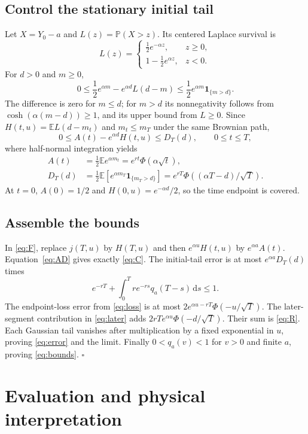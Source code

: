 \documentclass[11pt,a4paper]{article}
\newcommand{\Prob}{\mathbb P}
\newcommand{\E}{\mathbb E}
\newcommand{\dd}{\,\mathrm d}
\begin{document}
\subsection{Control the stationary initial tail}
Let $X=Y_0-a$ and $L(z)=\Prob(X>z)$. Its centered Laplace survival is
\[
L(z)=
\begin{cases}
\tfrac12e^{-\alpha z},&z\geq0,\\
1-\tfrac12e^{\alpha z},&z<0.
\end{cases}
\]
For $d>0$ and $m\geq0$,
\begin{equation}\label{eq:laplace}
0\leq \frac12e^{\alpha m}-e^{\alpha d}L(d-m)
\leq\frac12e^{\alpha m}\mathbf1_{\{m>d\}}.
\end{equation}
The difference is zero for $m\leq d$; for $m>d$ its nonnegativity follows
from $\cosh(\alpha(m-d))\geq1$, and its upper bound from $L\geq0$.
Since $H(t,u)=\E L(d-m_t)$ and $m_t\leq m_T$ under the same Brownian path,
\begin{equation}\label{eq:Hbound}
0\leq A(t)-e^{\alpha d}H(t,u)\leq D_T(d),\qquad 0\leq t\leq T,
\end{equation}
where half-normal integration yields
\begin{align}\label{eq:AD}
A(t)&=\tfrac12\E e^{\alpha m_t}=e^{rt}\Phi(\alpha\sqrt t),\\
D_T(d)&=\tfrac12\E[e^{\alpha m_T}\mathbf1_{\{m_T>d\}}]
=e^{rT}\Phi((\alpha T-d)/\sqrt T).\nonumber
\end{align}
At $t=0$, $A(0)=1/2$ and $H(0,u)=e^{-\alpha d}/2$,
so the time endpoint is covered.

\subsection{Assemble the bounds}
In \eqref{eq:F}, replace $j(T,u)$ by $H(T,u)$ and then
$e^{\alpha u}H(t,u)$ by $e^{\alpha a}A(t)$.
Equation~\eqref{eq:AD} gives exactly \eqref{eq:C}. The initial-tail error is
at most $e^{\alpha a}D_T(d)$ times
\[
e^{-rT}+\int_0^T re^{-rs}q_a(T-s)\dd s\leq1.
\]
The endpoint-loss error from \eqref{eq:loss} is at most
$2e^{\alpha u-rT}\Phi(-u/\sqrt T)$.
The later-segment contribution in \eqref{eq:later} adds
$2rTe^{\alpha u}\Phi(-d/\sqrt T)$. Their sum is \eqref{eq:R}.
Each Gaussian tail vanishes after multiplication by a fixed exponential
in $u$, proving \eqref{eq:error} and the limit. Finally $0<q_a(v)<1$
for $v>0$ and finite $a$, proving \eqref{eq:bounds}.
\hfill$\square$

\section{Evaluation and physical interpretation}
\end{document}
